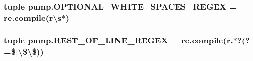 \subsubsection[{O\+P\+T\+I\+O\+N\+A\+L\+\_\+\+W\+H\+I\+T\+E\+\_\+\+S\+P\+A\+C\+E\+S\+\_\+\+R\+E\+G\+E\+X}]{\setlength{\rightskip}{0pt plus 5cm}tuple pump.\+O\+P\+T\+I\+O\+N\+A\+L\+\_\+\+W\+H\+I\+T\+E\+\_\+\+S\+P\+A\+C\+E\+S\+\_\+\+R\+E\+G\+E\+X = re.\+compile(r\textquotesingle{}\textbackslash{}s$\ast$\textquotesingle{})}\label{namespacepump_ad9744f334322fa37e310075e5e1ec40c}
\hypertarget{namespacepump_a9d83d0ef3310ed836f08fadd37b4409d}{}
\subsubsection[{R\+E\+S\+T\+\_\+\+O\+F\+\_\+\+L\+I\+N\+E\+\_\+\+R\+E\+G\+E\+X}]{\setlength{\rightskip}{0pt plus 5cm}tuple pump.\+R\+E\+S\+T\+\_\+\+O\+F\+\_\+\+L\+I\+N\+E\+\_\+\+R\+E\+G\+E\+X = re.\+compile(r\textquotesingle{}.$\ast$?(?=\$$\vert$\textbackslash{}\$\textbackslash{}\$)\textquotesingle{})}\label{namespacepump_a9d83d0ef3310ed836f08fadd37b4409d}
\hypertarget{namespacepump_a132b35d1104c7f479aa21c345f413477}{}
